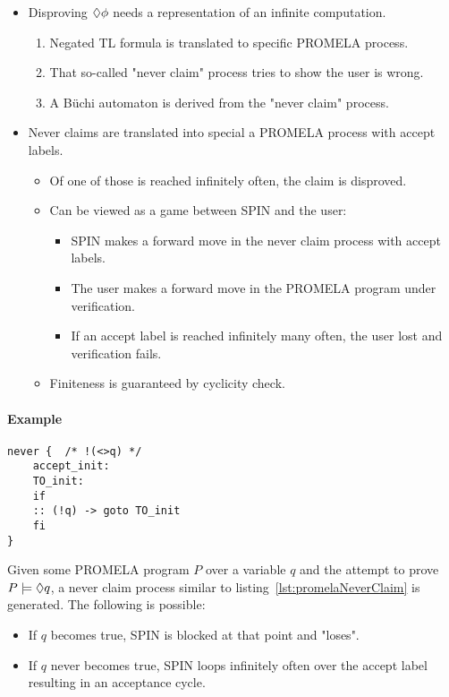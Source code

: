 				\begin{itemize}
					\item Disproving \( \lozenge \phi \) needs a representation of an infinite computation.
						\begin{enumerate}
							\item Negated TL formula is translated to specific PROMELA process.
							\item That so-called "never claim" process tries to show the user is wrong.
							\item A Büchi automaton is derived from the "never claim" process.
						\end{enumerate}
					\item Never claims are translated into special a PROMELA process with accept labels.
						\begin{itemize}
							\item Of one of those is reached infinitely often, the claim is disproved.
							\item Can be viewed as a game between SPIN and the user:
								\begin{itemize}
									\item SPIN makes a forward move in the never claim process with accept labels.
									\item The user makes a forward move in the PROMELA program under verification.
									\item If an accept label is reached infinitely many often, the user lost and verification fails.
								\end{itemize}
							\item Finiteness is guaranteed by cyclicity check.
						\end{itemize}
				\end{itemize}
			
				\paragraph{Example}
					\begin{lstlisting}[caption = { Never Claim PROMELA Process }, label = lst:promelaNeverClaim, language = PROMELA]
never {  /* !(<>q) */
	accept_init:
	TO_init:
	if
	:: (!q) -> goto TO_init
	fi
}
					\end{lstlisting}
				
					Given some PROMELA program \(P\) over a variable \(q\) and the attempt to prove \( P \models \lozenge q \), a never claim process similar to listing~\ref{lst:promelaNeverClaim} is generated. The following is possible:
					\begin{itemize}
						\item If \(q\) becomes true, SPIN is blocked at that point and "loses".
						\item If \(q\) never becomes true, SPIN loops infinitely often over the accept label resulting in an acceptance cycle.
					\end{itemize}
				
